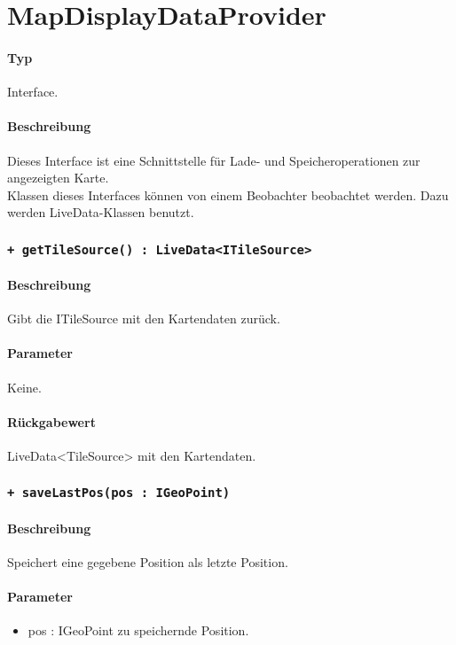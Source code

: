 \section{MapDisplayDataProvider}
\paragraph*{Typ}
Interface.
\paragraph*{Beschreibung}
Dieses Interface ist eine Schnittstelle für Lade- und Speicheroperationen zur angezeigten Karte.\\
Klassen dieses Interfaces können von einem Beobachter beobachtet werden. Dazu werden 
LiveData-Klassen benutzt.

\subsubsection{\texttt{+ getTileSource() : LiveData<ITileSource>}}%
\paragraph*{Beschreibung}
Gibt die ITileSource mit den Kartendaten zurück.
\paragraph*{Parameter}
Keine.
\paragraph*{Rückgabewert}
LiveData<TileSource> mit den Kartendaten.

\subsubsection{\texttt{+ saveLastPos(pos : IGeoPoint)}}%
\paragraph*{Beschreibung}
Speichert eine gegebene Position als letzte Position.
\paragraph*{Parameter}
\begin{itemize}
    \item pos : IGeoPoint zu speichernde Position.
\end{itemize}
